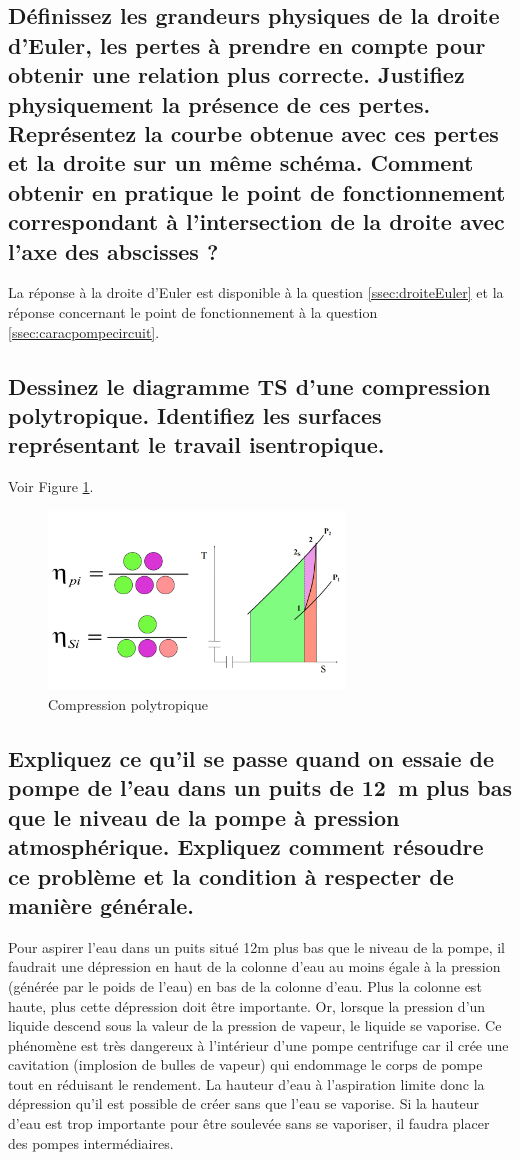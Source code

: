 \subsection{Définissez les grandeurs physiques de la droite d'Euler, les pertes à prendre en compte pour obtenir une relation plus correcte. Justifiez physiquement la présence de ces pertes. Représentez la courbe obtenue avec ces pertes et la droite sur un même schéma. Comment obtenir en pratique le point de fonctionnement correspondant à l'intersection de la droite avec l'axe des abscisses ?}
La réponse à la droite d'Euler est disponible à la question \ref{ssec:droiteEuler} et la réponse concernant le point de fonctionnement à la question \ref{ssec:caracpompecircuit}.

\subsection{Dessinez le diagramme TS d'une compression polytropique. Identifiez les surfaces représentant le travail isentropique.}
Voir Figure \ref{fig:compressionpolytropique}.
\begin{figure}[h]\centering
	\includegraphics[width=0.7\textwidth]{figures/compressionpolytropique.png}
	\caption{Compression polytropique}
	\label{fig:compressionpolytropique}
\end{figure}

\subsection{Expliquez ce qu'il se passe quand on essaie de pompe de l'eau dans un puits de \SI{12}{\meter} plus bas que le niveau de la pompe à pression atmosphérique. Expliquez comment résoudre ce problème et la condition à respecter de manière générale.}
Pour aspirer l’eau dans un puits situé 12m plus bas que le niveau de la pompe, il faudrait une dépression en haut de la colonne d’eau au moins égale à la pression (générée par le poids de l’eau) en bas de la colonne d’eau. Plus la colonne est haute, plus cette dépression doit être importante. Or, lorsque la pression d’un liquide descend sous la valeur de la pression de vapeur, le liquide se vaporise. Ce phénomène est très dangereux à l’intérieur d’une pompe centrifuge car il crée une cavitation (implosion de bulles de vapeur) qui endommage le corps de pompe tout en réduisant le rendement. 
La hauteur d’eau à l’aspiration limite donc la dépression qu’il est possible de créer sans que l’eau se vaporise. Si la hauteur d’eau est trop importante pour être soulevée sans se vaporiser, il faudra placer des pompes intermédiaires.

